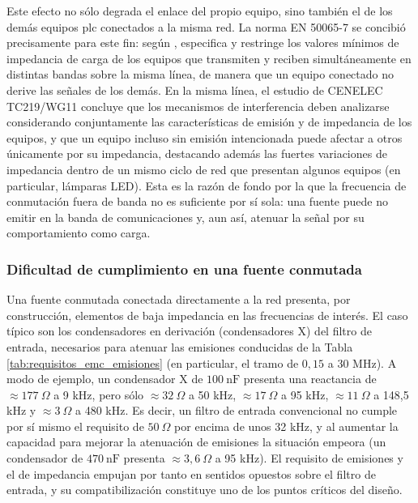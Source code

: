 Este efecto no sólo degrada el enlace del propio equipo, sino también el de los demás equipos \gls{plc} conectados a la misma red. La norma EN 50065-7 se concibió precisamente para este fin: según \cite{6525864}, especifica y restringe los valores mínimos de impedancia de carga de los equipos que transmiten y reciben simultáneamente en distintas bandas sobre la misma línea, de manera que un equipo conectado no derive las señales de los demás. En la misma línea, el estudio de CENELEC TC219/WG11 \cite{11238173} concluye que los mecanismos de interferencia deben analizarse considerando conjuntamente las características de emisión y de impedancia de los equipos, y que un equipo incluso sin emisión intencionada puede afectar a otros únicamente por su impedancia, destacando además las fuertes variaciones de impedancia dentro de un mismo ciclo de red que presentan algunos equipos (en particular, lámparas LED). Esta es la razón de fondo por la que la frecuencia de conmutación fuera de banda no es suficiente por sí sola: una fuente puede no emitir en la banda de comunicaciones y, aun así, atenuar la señal por su comportamiento como carga.

\subsubsection*{Dificultad de cumplimiento en una fuente conmutada}

Una fuente conmutada conectada directamente a la red presenta, por construcción, elementos de baja impedancia en las frecuencias de interés. El caso típico son los condensadores en derivación (condensadores X) del filtro de entrada, necesarios para atenuar las emisiones conducidas de la Tabla \ref{tab:requisitos_emc_emisiones} (en particular, el tramo de $0{,}15$ a $30$ MHz). A modo de ejemplo, un condensador X de $100\ \text{nF}$ presenta una reactancia de $\approx 177\ \Omega$ a 9 kHz, pero sólo $\approx 32\ \Omega$ a 50 kHz, $\approx 17\ \Omega$ a 95 kHz, $\approx 11\ \Omega$ a 148,5 kHz y $\approx 3\ \Omega$ a 480 kHz. Es decir, un filtro de entrada convencional no cumple por sí mismo el requisito de $50\ \Omega$ por encima de unos 32 kHz, y al aumentar la capacidad para mejorar la atenuación de emisiones la situación empeora (un condensador de $470\ \text{nF}$ presenta $\approx 3{,}6\ \Omega$ a 95 kHz). El requisito de emisiones y el de impedancia empujan por tanto en sentidos opuestos sobre el filtro de entrada, y su compatibilización constituye uno de los puntos críticos del diseño.

